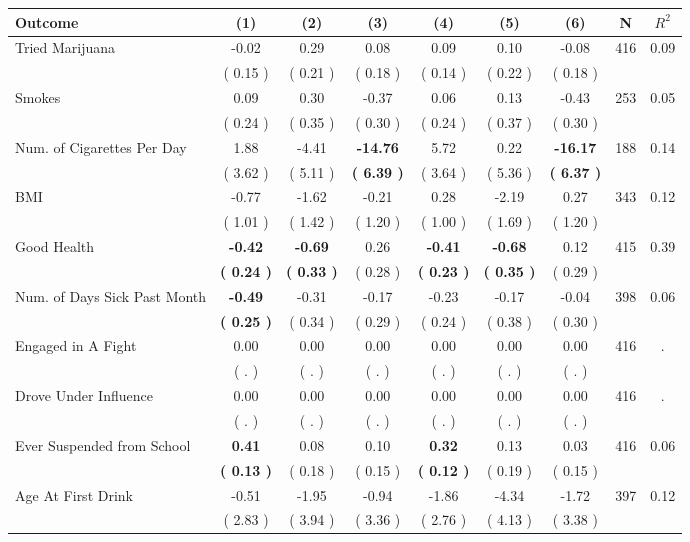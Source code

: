 \begin{tabular}{lcccccccc}
\toprule
 \textbf{Outcome} & \textbf{(1)} & \textbf{(2)} & \textbf{(3)} & \textbf{(4)} & \textbf{(5)} & \textbf{(6)} & \textbf{N} & \textbf{$ R^2$} \\
\midrule
Tried Marijuana &     -0.02 &      0.29 &      0.08 &      0.09 &      0.10 &     -0.08 & 416 &       0.09 \\ 
 & (     0.15 ) & (     0.21 ) & (     0.18 ) & (     0.14 ) & (     0.22 ) & (     0.18 ) & \\
Smokes &      0.09 &      0.30 &     -0.37 &      0.06 &      0.13 &     -0.43 & 253 &       0.05 \\ 
 & (     0.24 ) & (     0.35 ) & (     0.30 ) & (     0.24 ) & (     0.37 ) & (     0.30 ) & \\
Num. of Cigarettes Per Day &      1.88 &     -4.41 & \textbf{   -14.76} &      5.72 &      0.22 & \textbf{   -16.17} & 188 &       0.14 \\ 
 & (     3.62 ) & (     5.11 ) & \textbf{(     6.39 )} & (     3.64 ) & (     5.36 ) & \textbf{(     6.37 )} & \\
BMI &     -0.77 &     -1.62 &     -0.21 &      0.28 &     -2.19 &      0.27 & 343 &       0.12 \\ 
 & (     1.01 ) & (     1.42 ) & (     1.20 ) & (     1.00 ) & (     1.69 ) & (     1.20 ) & \\
Good Health & \textbf{    -0.42} & \textbf{    -0.69} &      0.26 & \textbf{    -0.41} & \textbf{    -0.68} &      0.12 & 415 &       0.39 \\ 
 & \textbf{(     0.24 )} & \textbf{(     0.33 )} & (     0.28 ) & \textbf{(     0.23 )} & \textbf{(     0.35 )} & (     0.29 ) & \\
Num. of Days Sick Past Month & \textbf{    -0.49} &     -0.31 &     -0.17 &     -0.23 &     -0.17 &     -0.04 & 398 &       0.06 \\ 
 & \textbf{(     0.25 )} & (     0.34 ) & (     0.29 ) & (     0.24 ) & (     0.38 ) & (     0.30 ) & \\
Engaged in A Fight &      0.00 &      0.00 &      0.00 &      0.00 &      0.00 &      0.00 & 416 &          . \\ 
 & (        . ) & (        . ) & (        . ) & (        . ) & (        . ) & (        . ) & \\
Drove Under Influence &      0.00 &      0.00 &      0.00 &      0.00 &      0.00 &      0.00 & 416 &          . \\ 
 & (        . ) & (        . ) & (        . ) & (        . ) & (        . ) & (        . ) & \\
Ever Suspended from School & \textbf{     0.41} &      0.08 &      0.10 & \textbf{     0.32} &      0.13 &      0.03 & 416 &       0.06 \\ 
 & \textbf{(     0.13 )} & (     0.18 ) & (     0.15 ) & \textbf{(     0.12 )} & (     0.19 ) & (     0.15 ) & \\
Age At First Drink &     -0.51 &     -1.95 &     -0.94 &     -1.86 &     -4.34 &     -1.72 & 397 &       0.12 \\ 
 & (     2.83 ) & (     3.94 ) & (     3.36 ) & (     2.76 ) & (     4.13 ) & (     3.38 ) & \\
\bottomrule
\end{tabular}
